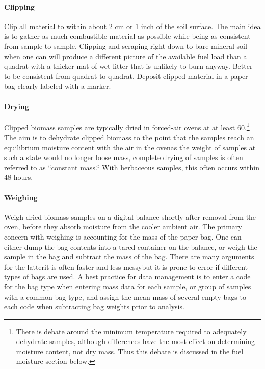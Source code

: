 \paragraph{Clipping} 

Clip all material to within about 2 cm or 1 inch of the soil surface. 
The main idea is to gather as much combustible material as possible while being as consistent from sample to sample. 
Clipping and scraping right down to bare mineral soil when one can will produce a different picture of the available fuel load than a quadrat with a thicker mat of wet litter that is unlikely to burn anyway. 
Better to be consistent from quadrat to quadrat. 
Deposit clipped material in a paper bag clearly labeled with a marker. 


\paragraph{Drying}

Clipped biomass samples are typically dried in forced-air ovens at at least 60\degC.\footnote{There is debate around the minimum temperature required to adequately dehydrate samples, although differences have the most effect on determining moisture content, not dry mass. 
	Thus this debate is discussed in the fuel moisture section below.}
The aim is to dehydrate clipped biomass to the point that the samples reach an equilibrium moisture content with the air in the oven\textemdash as the weight of samples at such a state would no longer loose mass, complete drying of samples is often referred to as ``constant mass.``
With herbaceous samples, this often occurs within 48 hours. 
 
\paragraph{Weighing}

Weigh dried biomass samples on a digital balance shortly after removal from the oven, before they absorb moisture from the cooler ambient air. 
The primary concern with weighing is accounting for the mass of the paper bag. 
One can either dump the bag contents into a tared container on the balance, or weigh the sample in the bag and subtract the mass of the bag. 
There are many arguments for the latter\textemdash it is often faster and less messy\textemdash but it is prone to error if different types of bags are used. 
A best practice for data management is to enter a code for the bag type when entering mass data for each sample, or group of samples with a common bag type, and assign the mean mass of several empty bags to each code when subtracting bag weights prior to analysis.

